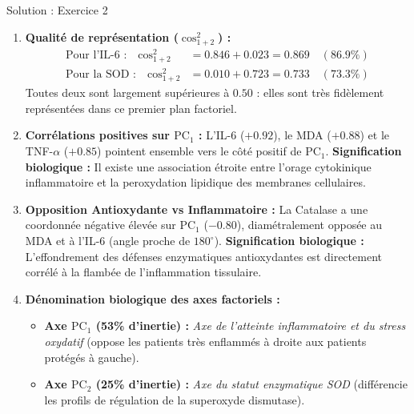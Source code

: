 \documentclass[11pt,a4paper]{article}
\begin{document}
\begin{solutionbox}{Solution : Exercice 2}
\begin{enumerate}[label=\textbf{\alph*.}]
  \item \textbf{Qualité de représentation ($\cos^2_{1+2}$) :}
  \begin{align*}
    \text{Pour l'IL-6 :} \quad \cos^2_{1+2} &= 0.846 + 0.023 = \mathbf{0.869} \quad (86.9\%) \\
    \text{Pour la SOD :} \quad \cos^2_{1+2} &= 0.010 + 0.723 = \mathbf{0.733} \quad (73.3\%)
  \end{align*}
  Toutes deux sont largement supérieures à $0.50$ : elles sont très fidèlement représentées dans ce premier plan factoriel.
  \item \textbf{Corrélations positives sur $\text{PC}_1$ :}
  L'IL-6 ($+0.92$), le MDA ($+0.88$) et le TNF-$\alpha$ ($+0.85$) pointent ensemble vers le côté positif de $\text{PC}_1$.
  \textbf{Signification biologique :} Il existe une association étroite entre l'orage cytokinique inflammatoire et la peroxydation lipidique des membranes cellulaires.
  \item \textbf{Opposition Antioxydante vs Inflammatoire :}
  La Catalase a une coordonnée négative élevée sur $\text{PC}_1$ ($-0.80$), diamétralement opposée au MDA et à l'IL-6 (angle proche de $180^\circ$).
  \textbf{Signification biologique :} L'effondrement des défenses enzymatiques antioxydantes est directement corrélé à la flambée de l'inflammation tissulaire.
  \item \textbf{Dénomination biologique des axes factoriels :}
  \begin{itemize}
    \item \textbf{Axe $\text{PC}_1$ (53\% d'inertie) :} \textit{Axe de l'atteinte inflammatoire et du stress oxydatif} (oppose les patients très enflammés à droite aux patients protégés à gauche).
    \item \textbf{Axe $\text{PC}_2$ (25\% d'inertie) :} \textit{Axe du statut enzymatique SOD} (différencie les profils de régulation de la superoxyde dismutase).
  \end{itemize}
\end{enumerate}
\end{solutionbox}
\end{document}
